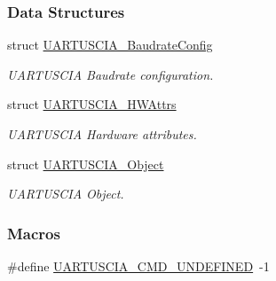 \subsubsection*{Data Structures}
\begin{DoxyCompactItemize}
\item 
struct \hyperlink{struct_u_a_r_t_u_s_c_i_a___baudrate_config}{U\-A\-R\-T\-U\-S\-C\-I\-A\-\_\-\-Baudrate\-Config}
\begin{DoxyCompactList}\small\item\em U\-A\-R\-T\-U\-S\-C\-I\-A Baudrate configuration. \end{DoxyCompactList}\item 
struct \hyperlink{struct_u_a_r_t_u_s_c_i_a___h_w_attrs}{U\-A\-R\-T\-U\-S\-C\-I\-A\-\_\-\-H\-W\-Attrs}
\begin{DoxyCompactList}\small\item\em U\-A\-R\-T\-U\-S\-C\-I\-A Hardware attributes. \end{DoxyCompactList}\item 
struct \hyperlink{struct_u_a_r_t_u_s_c_i_a___object}{U\-A\-R\-T\-U\-S\-C\-I\-A\-\_\-\-Object}
\begin{DoxyCompactList}\small\item\em U\-A\-R\-T\-U\-S\-C\-I\-A Object. \end{DoxyCompactList}\end{DoxyCompactItemize}
\subsubsection*{Macros}
\begin{DoxyCompactItemize}
\item 
\#define \hyperlink{_u_a_r_t_u_s_c_i_a_8h_ab16a1bf966f22b5eabf64c79fc49c33e}{U\-A\-R\-T\-U\-S\-C\-I\-A\-\_\-\-C\-M\-D\-\_\-\-U\-N\-D\-E\-F\-I\-N\-E\-D}~-\/1
\end{DoxyCompactItemize}
